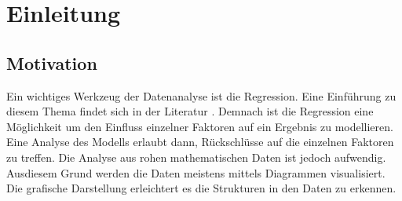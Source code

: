 \chapter{Einleitung}
\label{cha:Einleitung}



\section{Motivation}
\label{sec:Motivation}

%

Ein wichtiges Werkzeug der Datenanalyse ist die Regression. Eine Einführung zu diesem Thema findet sich in der Literatur \parencite{RegressionGrundlagen}. Demnach ist die Regression eine Möglichkeit um den Einfluss einzelner Faktoren auf ein Ergebnis zu modellieren. Eine Analyse des Modells erlaubt dann, Rückschlüsse auf die einzelnen Faktoren zu treffen. Die Analyse aus rohen mathematischen Daten ist jedoch aufwendig. Aus\linebreak diesem Grund werden die Daten meistens mittels Diagrammen visualisiert. Die grafische Darstellung erleichtert es die Strukturen in den Daten zu erkennen.

